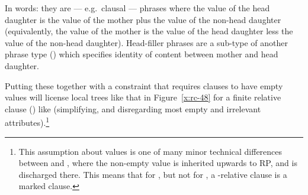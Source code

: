 \documentclass[output=paper
 	        ,biblatex
                ,babelshorthands
                ,newtxmath
                ,draftmode
                ,colorlinks, citecolor=brown
]{langscibook}
\begin{document}
\begin{exe}\ex\label{x:rc-47}
\end{exe}
In words: they are  ---
e.g.\ clausal --- phrases where the  value of the head daughter is the
 value of the mother plus the  value of the non-head daughter
(equivalently, the  value of the mother is the  value of the
head daughter less the  value of the non-head daughter). Head-filler phrases are a
sub-type of another phrase type () which specifies identity of
content between mother and head daughter.

Putting these together with a constraint that requires clauses to have empty 
values will license local trees like that in Figure~\ref{x:rc-48} for a finite relative
clause () like  (simplifying, and
disregarding most empty and irrelevant attributes).\footnote{\label{fn:rc-3}This
  assumption about  values is one of many minor technical differences between
  \cite{Sag:97} and \cite{Pollard:Sag:94}, where the non-empty  value is
  inherited upwards to RP, and is discharged there. This means
  that for \citeauthor{Pollard:Sag:94}, but not for \cite{Sag:97}, a -relative
  clause is a  marked clause.}
\end{document}
